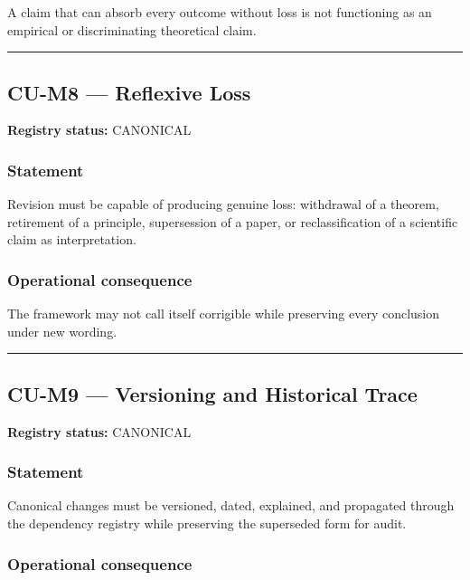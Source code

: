 \documentclass[
  11pt,
]{article}
\begin{document}
A claim that can absorb every outcome without loss is not functioning as
an empirical or discriminating theoretical claim.

\begin{center}\rule{0.5\linewidth}{0.5pt}\end{center}

\subsection{CU-M8 --- Reflexive Loss}\label{cu-m8-reflexive-loss}

\textbf{Registry status:} CANONICAL

\subsubsection{Statement}\label{statement-16}

Revision must be capable of producing genuine loss: withdrawal of a
theorem, retirement of a principle, supersession of a paper, or
reclassification of a scientific claim as interpretation.

\subsubsection{Operational
consequence}\label{operational-consequence-16}

The framework may not call itself corrigible while preserving every
conclusion under new wording.

\begin{center}\rule{0.5\linewidth}{0.5pt}\end{center}

\subsection{CU-M9 --- Versioning and Historical
Trace}\label{cu-m9-versioning-and-historical-trace}

\textbf{Registry status:} CANONICAL

\subsubsection{Statement}\label{statement-17}

Canonical changes must be versioned, dated, explained, and propagated
through the dependency registry while preserving the superseded form for
audit.

\subsubsection{Operational
consequence}\label{operational-consequence-17}
\end{document}
